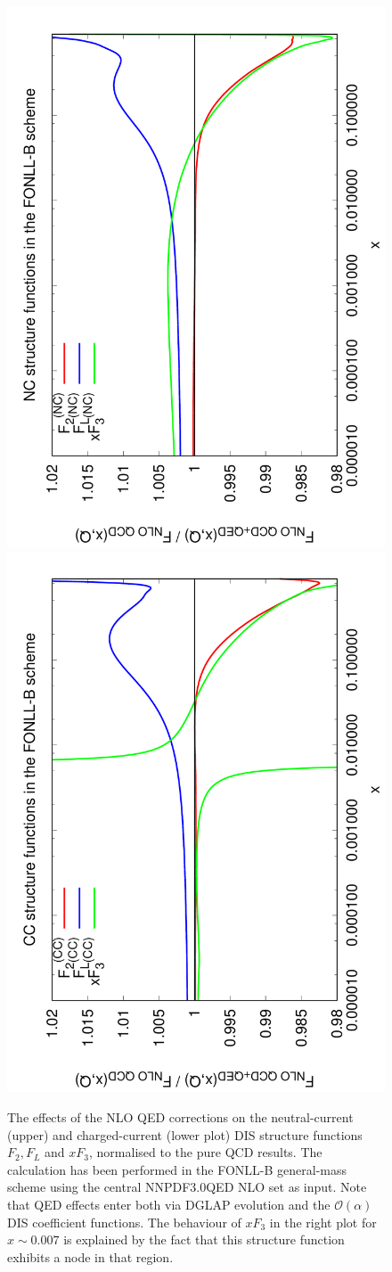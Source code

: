 \begin{figure}[!ht]
\centering
\includegraphics[width=0.7\columnwidth,angle=270]{figs/NLOQEDCorrections_NC.pdf}
\includegraphics[width=0.7\columnwidth,angle=270]{figs/NLOQEDCorrections_CC.pdf}
\caption{The effects of the NLO QED corrections on the neutral-current
(upper) and charged-current (lower plot) DIS structure functions
$F_2, F_L$ and $xF_3$, normalised to the pure QCD results.
%
The calculation has been performed in the FONLL-B general-mass scheme using the
central NNPDF3.0QED NLO
set as input.
%
Note that QED effects enter both via DGLAP evolution and the
$\mathcal{O}(\alpha)$ DIS coefficient functions.
%
The behaviour of $xF_3$ in the right plot for $x\sim 0.007$ is explained
by the fact that this structure function exhibits a node in that region.
}
\label{fig:StructFuncs}
\end{figure}
